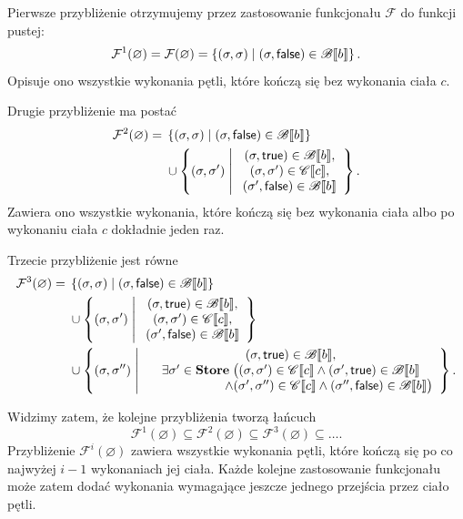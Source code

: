 \documentclass[11pt,a4paper]{article}
\theoremstyle{definition}
\theoremstyle{plain}
\DeclarePairedDelimiter{\semdelim}{\llbracket}{\rrbracket}
\newcommand{\sem}[1]{\semdelim{#1}}
\newcommand{\Cc}{\mathscr{C}}   %
\newcommand{\Bb}{\mathscr{B}}   %
\newcommand{\Store}{\textbf{Store}}
\newcommand{\kw}[1]{\ensuremath{\mathsf{#1}}} %
\begin{document}
Pierwsze przybliżenie otrzymujemy przez zastosowanie funkcjonału
$\mathcal{F}$ do funkcji pustej:
\[
\begin{aligned}
	\mathcal{F}^1(\varnothing)
	=
	\mathcal{F}(\varnothing)
	=
	\left\{
	(\sigma,\sigma)
	\;\middle|\;
	(\sigma,\kw{false})\in\Bb\sem{b}
	\right\}.
\end{aligned}
\]
Opisuje ono wszystkie wykonania pętli, które kończą się bez wykonania
ciała $c$.

Drugie przybliżenie ma postać
\[
\begin{aligned}
	\mathcal{F}^2(\varnothing)
	={}&
	\left\{
	(\sigma,\sigma)
	\;\middle|\;
	(\sigma,\kw{false})\in\Bb\sem{b}
	\right\}
	\\
	&{}\cup
	\left\{
	(\sigma,\sigma')
	\;\middle|\;
	\begin{array}{c}
		(\sigma,\kw{true})\in\Bb\sem{b},\\
		(\sigma,\sigma')\in\Cc\sem{c},\\
		(\sigma',\kw{false})\in\Bb\sem{b}
	\end{array}
	\right\}.
\end{aligned}
\]
Zawiera ono wszystkie wykonania, które kończą się bez wykonania ciała
albo po wykonaniu ciała $c$ dokładnie jeden raz.

Trzecie przybliżenie jest równe
\[
\begin{aligned}
	\mathcal{F}^3(\varnothing)
	={}&
	\left\{
	(\sigma,\sigma)
	\;\middle|\;
	(\sigma,\kw{false})\in\Bb\sem{b}
	\right\}
	\\
	&{}\cup
	\left\{
	(\sigma,\sigma')
	\;\middle|\;
	\begin{array}{c}
		(\sigma,\kw{true})\in\Bb\sem{b},\\
		(\sigma,\sigma')\in\Cc\sem{c},\\
		(\sigma',\kw{false})\in\Bb\sem{b}
	\end{array}
	\right\}
	\\
	&{}\cup
	\left\{
	(\sigma,\sigma'')
	\;\middle|\;
	\begin{array}{c}
		(\sigma,\kw{true})\in\Bb\sem{b},\\
		\exists\sigma'\in\Store\;
		\big(
		(\sigma,\sigma')\in\Cc\sem{c}
		\land
		(\sigma',\kw{true})\in\Bb\sem{b}
		\\
		\qquad\qquad\qquad
		\land
		(\sigma',\sigma'')\in\Cc\sem{c}
		\land
		(\sigma'',\kw{false})\in\Bb\sem{b}
		\big)
	\end{array}
	\right\}.
\end{aligned}
\]

Widzimy zatem, że kolejne przybliżenia tworzą łańcuch
\[
\mathcal{F}^1(\varnothing)
\subseteq
\mathcal{F}^2(\varnothing)
\subseteq
\mathcal{F}^3(\varnothing)
\subseteq\ldots.
\]
Przybliżenie $\mathcal{F}^i(\varnothing)$ zawiera wszystkie wykonania
pętli, które kończą się po co najwyżej $i-1$ wykonaniach jej
ciała. Każde kolejne zastosowanie funkcjonału może zatem dodać wykonania
wymagające jeszcze jednego przejścia przez ciało pętli.
\end{document}
